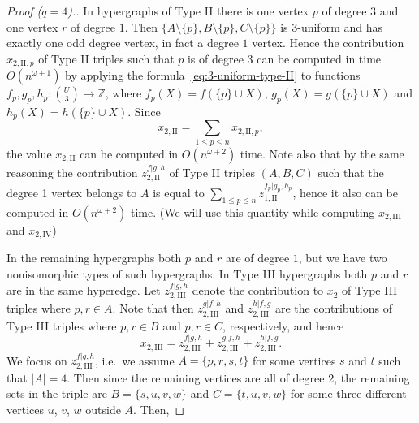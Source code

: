 \documentclass{amsart}
\begin{document}
\begin{proof}[Proof ($q=4$).]
In hypergraphs of Type II there is one vertex $p$ of degree $3$ and one vertex $r$ of degree $1$.
Then $\{A\setminus\{p\},B\setminus\{p\},C\setminus\{p\}\}$ is 3-uniform and has exactly one odd degree vertex, in fact a degree $1$ vertex.
Hence the contribution $x_{2,\mathrm{II},p}$ of Type II triples such that $p$ is of degree $3$ can be computed in time $O(n^{\omega+1})$ by applying the formula~\eqref{eq:3-uniform-type-II} to functions $f_{p},g_{p},h_{p}:{U\choose 3}\rightarrow \mathbb{Z}$, where $f_{p}(X)=f(\{p\}\cup X)$, $g_p(X)=g(\{p\}\cup X)$ and $h_p(X)=h(\{p\}\cup X)$. 
Since \[x_{2,\mathrm{II}} = \sum_{1\le p\le n} x_{2,\mathrm{II},p},\]
the value $x_{2,\mathrm{II}}$ can be computed in $O(n^{\omega+2})$ time.
Note also that by the same reasoning the contribution $z_{2,\mathrm{II}}^{f|g,h}$ of Type II triples $(A,B,C)$ such that the degree 1 vertex belongs to $A$ is equal to $\sum_{1\le p\le n} z_{1,\mathrm{II}}^{f_p|g_p,h_p}$, hence it also can be computed in $O(n^{\omega+2})$ time. (We will use this quantity while computing $x_{2,\mathrm{III}}$ and $x_{2,\mathrm{IV}}$)

In the remaining hypergraphs both $p$ and $r$ are of degree $1$, but we have two nonisomorphic types of such hypergraphs.
In Type III hypergraphs both $p$ and $r$ are in the same hyperedge.
Let $z_{2,\mathrm{III}}^{f|g,h}$ denote the contribution to $x_2$ of Type III triples where $p,r\in A$.
Note that then $z_{2,\mathrm{III}}^{g|f,h}$ and $z_{2,\mathrm{III}}^{h|f,g}$ are the contributions of Type III triples where $p,r\in B$ and $p,r\in C$, respectively, and hence 
\begin{equation}
\label{eq:4-uniform-type-III}
 x_{2,\mathrm{III}}=z_{2,\mathrm{III}}^{f|g,h}+z_{2,\mathrm{III}}^{g|f,h}+z_{2,\mathrm{III}}^{h|f,g}.
\end{equation}
We focus on $z_{2,\mathrm{III}}^{f|g,h}$, i.e.\ we assume $A=\{p,r,s,t\}$ for some vertices $s$ and $t$ such that $|A|=4$.
Then since the remaining vertices are all of degree $2$, the remaining sets in the triple are $B=\{s,u,v,w\}$ and $C=\{t,u,v,w\}$ for some three different vertices $u$, $v$, $w$ outside $A$. Then,


\end{proof}
\end{document}
